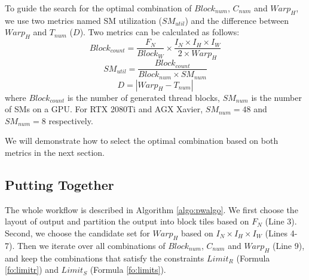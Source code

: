 To guide the search for the optimal combination of $Block_{num}$, $C_{num}$ and $Warp_H$, we use two metrics named SM utilization ($SM_{util}$) and the difference between $Warp_H$ and $T_{num}$ ($D$).
Two metrics can be calculated as follows:
\begin{equation}\nonumber
    Block_{count}=\frac{F_N}{Block_W} \times \frac{I_N \times I_H \times I_W}{2 \times Warp_H}
\end{equation}
\begin{equation}
    SM_{util}=\frac{Block_{count}}{Block_{num}\times SM_{num}}
    \label{fo:smutil}
\end{equation}
\begin{equation}
    D = |Warp_H-T_{num}|
    \label{fo:diff}
\end{equation}
where $Block_{count}$ is the number of generated thread blocks, $SM_{num}$ is the number of SMs on a GPU. For RTX 2080Ti and AGX Xavier, $SM_{num}=48$ and $SM_{num}=8$ respectively.

We will demonstrate how to select the optimal combination based on both metrics in the next section.

\subsection{Putting Together}
The whole workflow is described in Algorithm \ref{algo:pwalgo}.
We first choose the layout of output and partition the output into block tiles based on $F_N$ (Line 3).
Second, we choose the candidate set for $Warp_H$ based on $I_N \times I_H \times I_W$ (Lines 4-7).
Then we iterate over all combinations of $Block_{num}$, $C_{num}$ and $Warp_H$ (Line 9), and keep the combinations that satisfy the constraints $Limit_R$ (Formula \ref{fo:limitr}) and $Limit_S$ (Formula \ref{fo:limits}).

